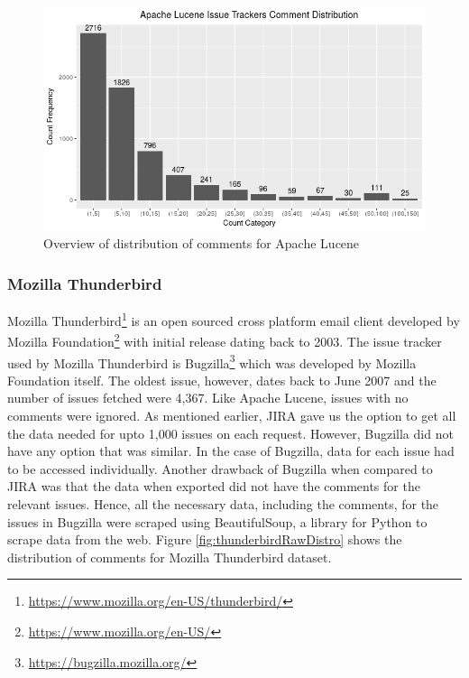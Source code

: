 \documentclass[a4paper,12pt,twoside]{report}
\begin{document}
\begin{figure}[h] %
    \centering
    \includegraphics[width=14cm]{lucene-comment-distribution-raw}
    \caption{Overview of distribution of comments for Apache Lucene}
    \label{fig:luceneRawDistro}
\end{figure}

\subsubsection{Mozilla Thunderbird}
Mozilla Thunderbird\footnote{\url{https://www.mozilla.org/en-US/thunderbird/}} is an open sourced cross platform email client developed by Mozilla Foundation\footnote{\url{https://www.mozilla.org/en-US/}} with initial release dating back to 2003. The issue tracker used by Mozilla Thunderbird is Bugzilla\footnote{\url{https://bugzilla.mozilla.org/}} which was developed by Mozilla Foundation itself. The oldest issue, however, dates back to June 2007 and the number of issues fetched were 4,367. Like Apache Lucene, issues with no comments were ignored. 
\bigbreak
As mentioned earlier, JIRA gave us the option to get all the data needed for upto 1,000 issues on each request. However, Bugzilla did not have any option that was similar. In the case of Bugzilla, data for each issue had to be accessed individually. Another drawback of Bugzilla when compared to JIRA was that the data when exported did not have the comments for the relevant issues. Hence, all the necessary data, including the comments, for the issues in Bugzilla were scraped using BeautifulSoup, a library for Python to scrape data from the web. Figure \ref{fig:thunderbirdRawDistro} shows the distribution of comments for Mozilla Thunderbird dataset. 
\end{document}
